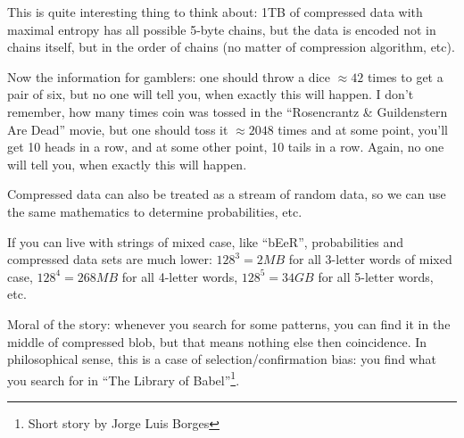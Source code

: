 This is quite interesting thing to think about: 1TB of compressed data with maximal entropy has all possible 5-byte chains,
but the data is encoded not in chains itself, but in the order of chains (no matter of compression algorithm, etc).

Now the information for gamblers: one should throw a dice $\approx 42$ times to get a pair of six, but no one will tell you, when exactly this will happen.
I don't remember, how many times coin was tossed in the ``Rosencrantz \& Guildenstern Are Dead'' movie, but one should toss it $\approx 2048$ times and at some point, you'll get 10 heads in a row,
and at some other point, 10 tails in a row. Again, no one will tell you, when exactly this will happen.

Compressed data can also be treated as a stream of random data, so we can use the same mathematics to determine probabilities, etc.

If you can live with strings of mixed case, like ``bEeR'', probabilities and compressed data sets are much lower:
$128^3=2MB$ for all 3-letter words of mixed case,
$128^4=268MB$ for all 4-letter words,
$128^5=34GB$ for all 5-letter words, etc.

Moral of the story: whenever you search for some patterns, you can find it in the middle of compressed blob, but that means nothing else then coincidence.
In philosophical sense, this is a case of selection/confirmation bias: you find what you search for in ``The Library of Babel''\footnote{Short story by Jorge Luis Borges}.

